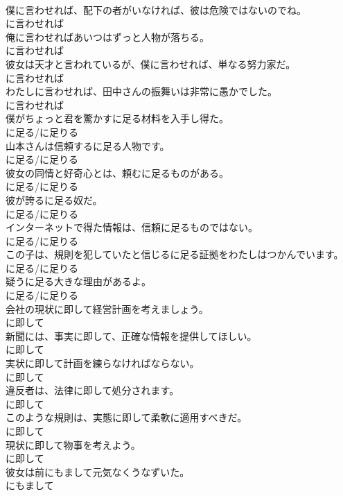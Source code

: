 \documentclass[8pt]{extreport}
\begin{document}
\begin{CJK}{UTF8}{min}
\\	僕に言わせれば、配下の者がいなければ、彼は危険ではないのでね。	
\\	に言わせれば
\\	俺に言わせればあいつはずっと人物が落ちる。	
\\	に言わせれば
\\	彼女は天才と言われているが、僕に言わせれば、単なる努力家だ。	
\\	に言わせれば
\\	わたしに言わせれば、田中さんの振舞いは非常に愚かでした。	
\\	に言わせれば
\\	僕がちょっと君を驚かすに足る材料を入手し得た。	
\\	に足る/に足りる
\\	山本さんは信頼するに足る人物です。	
\\	に足る/に足りる
\\	彼女の同情と好奇心とは、頼むに足るものがある。	
\\	に足る/に足りる
\\	彼が誇るに足る奴だ。	
\\	に足る/に足りる
\\	インターネットで得た情報は、信頼に足るものではない。	
\\	に足る/に足りる
\\	この子は、規則を犯していたと信じるに足る証拠をわたしはつかんでいます。	
\\	に足る/に足りる
\\	疑うに足る大きな理由があるよ。	
\\	に足る/に足りる
\\	会社の現状に即して経営計画を考えましょう。	
\\	に即して
\\	新聞には、事実に即して、正確な情報を提供してほしい。	
\\	に即して
\\	実状に即して計画を練らなければならない。	
\\	に即して
\\	違反者は、法律に即して処分されます。	
\\	に即して
\\	このような規則は、実態に即して柔軟に適用すべきだ。	
\\	に即して
\\	現状に即して物事を考えよう。	
\\	に即して
\\	彼女は前にもまして元気なくうなずいた。	
\\	にもまして

\end{CJK}
\end{document}
